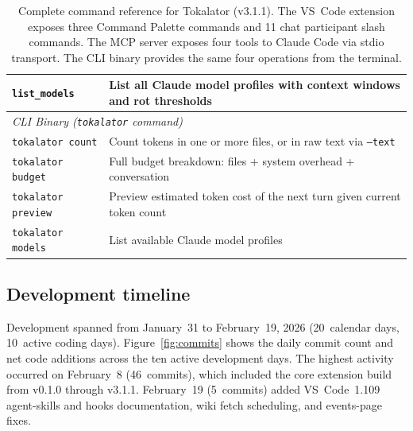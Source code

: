 \documentclass[a4paper,fleqn]{cas-dc}
\begin{document}
\begin{table}[htp!]
\begin{tabular}{|l|p{7.5cm}|}
\hline
\texttt{list\_models} & List all Claude model profiles with context windows and rot thresholds \\
\hline
\multicolumn{2}{|l|}{\textit{CLI Binary (\texttt{tokalator} command)}} \\
\hline
\texttt{tokalator count} & Count tokens in one or more files, or in raw text via \texttt{--text} \\
\hline
\texttt{tokalator budget} & Full budget breakdown: files + system overhead + conversation \\
\hline
\texttt{tokalator preview} & Preview estimated token cost of the next turn given current token count \\
\hline
\texttt{tokalator models} & List available Claude model profiles \\
\hline
\end{tabular}
\caption{Complete command reference for Tokalator (v3.1.1). The VS~Code extension exposes three Command Palette commands and 11 chat participant slash commands. The MCP server exposes four tools to Claude Code via stdio transport. The CLI binary provides the same four operations from the terminal.}
\label{tab:commands}
\end{table}


\subsection{Development timeline}

Development spanned from January~31 to February~19, 2026 (20~calendar days, 10~active coding days).
Figure~\ref{fig:commits} shows the daily commit count and net code additions across the ten active development days. The highest activity occurred on February~8 (46~commits), which included the core extension build from v0.1.0 through v3.1.1. February~19 (5~commits) added VS~Code~1.109 agent-skills and hooks documentation, wiki fetch scheduling, and events-page fixes.
\end{document}
